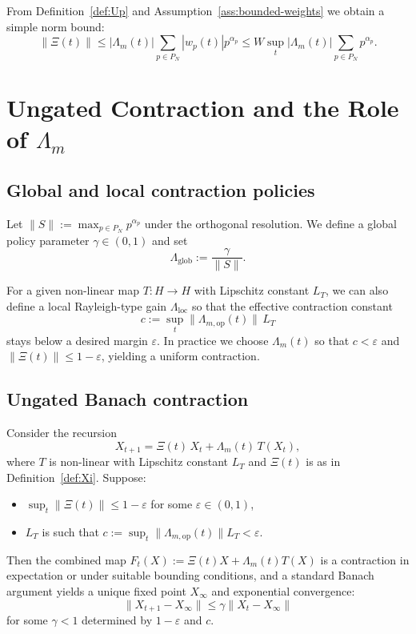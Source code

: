 \documentclass[11pt]{article}
\begin{document}
From Definition~\ref{def:Up} and Assumption~\ref{ass:bounded-weights} we obtain
a simple norm bound:
\[
\|\Xi(t)\| \le |\Lambda_m(t)| \sum_{p \in P_N} |w_p(t)| p^{\alpha_p}
\le W \sup_t |\Lambda_m(t)| \sum_{p \in P_N} p^{\alpha_p}.
\]

\section{Ungated Contraction and the Role of $\Lambda_m$}

\subsection{Global and local contraction policies}

Let $\|S\| := \max_{p \in P_N} p^{\alpha_p}$ under the orthogonal resolution.
We define a global policy parameter $\gamma \in (0,1)$ and set
\[
\Lambda_{\mathrm{glob}} := \frac{\gamma}{\|S\|}.
\]

For a given non-linear map $T: H \to H$ with Lipschitz constant $L_T$,
we can also define a local Rayleigh-type gain $\Lambda_{\mathrm{loc}}$ so that
the effective contraction constant
\[
c := \sup_t \|\Lambda_{m,\mathrm{op}}(t)\|\, L_T
\]
stays below a desired margin $\varepsilon$. In practice we choose
$\Lambda_m(t)$ so that $c < \varepsilon$ and $\|\Xi(t)\| \le 1 - \varepsilon$,
yielding a uniform contraction.

\subsection{Ungated Banach contraction}

Consider the recursion
\begin{equation}\label{eq:ungated-recursion}
X_{t+1} = \Xi(t)\, X_t + \Lambda_m(t)\, T(X_t),
\end{equation}
where $T$ is non-linear with Lipschitz constant $L_T$ and $\Xi(t)$ is as in
Definition~\ref{def:Xi}. Suppose:
\begin{itemize}
    \item $\sup_t \|\Xi(t)\| \le 1 - \varepsilon$ for some $\varepsilon \in (0,1)$,
    \item $L_T$ is such that $c := \sup_t \|\Lambda_{m,\mathrm{op}}(t)\| L_T
    < \varepsilon$.
\end{itemize}
Then the combined map $F_t(X) := \Xi(t)X + \Lambda_m(t) T(X)$ is a contraction
in expectation or under suitable bounding conditions, and a standard Banach
argument yields a unique fixed point $X_\infty$ and exponential convergence:
\[
\|X_{t+1} - X_\infty\| \le \gamma \|X_t - X_\infty\|
\]
for some $\gamma < 1$ determined by $1-\varepsilon$ and $c$.\cite{postquantum-intro}
\end{document}
